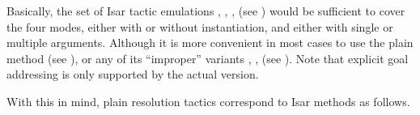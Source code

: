 \begin{isabellebody}
\begin{isamarkuptext}
\begin{enumerate}
  \end{enumerate}

  Basically, the set of Isar tactic emulations \mbox{},
  \mbox{}, \mbox{}, \mbox{} (see
  ) would be sufficient to cover the four modes,
  either with or without instantiation, and either with single or
  multiple arguments.  Although it is more convenient in most cases to
  use the plain \mbox{} method (see
  ), or any of its ``improper'' variants
  \mbox{}, \mbox{}, \mbox{} (see
  ).  Note that explicit goal addressing is
  only supported by the actual \mbox{} version.

  With this in mind, plain resolution tactics correspond to Isar
  methods as follows.


\end{isamarkuptext}
\end{isabellebody}
